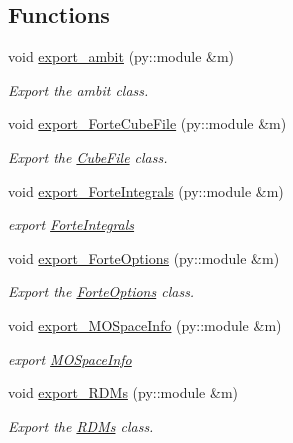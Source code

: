 \subsection*{Functions}
\begin{DoxyCompactItemize}
\item 
void \mbox{\hyperlink{namespaceforte_a7332c10d053d305ad03f4c29c0560031}{export\+\_\+ambit}} (py\+::module \&m)
\begin{DoxyCompactList}\small\item\em Export the ambit class. \end{DoxyCompactList}\item 
void \mbox{\hyperlink{namespaceforte_a646338877ef11d2794e546940f7118c2}{export\+\_\+\+Forte\+Cube\+File}} (py\+::module \&m)
\begin{DoxyCompactList}\small\item\em Export the \mbox{\hyperlink{classforte_1_1_cube_file}{Cube\+File}} class. \end{DoxyCompactList}\item 
void \mbox{\hyperlink{namespaceforte_aefcd99a0cde40f5fa1792e297ed6cd74}{export\+\_\+\+Forte\+Integrals}} (py\+::module \&m)
\begin{DoxyCompactList}\small\item\em export \mbox{\hyperlink{classforte_1_1_forte_integrals}{Forte\+Integrals}} \end{DoxyCompactList}\item 
void \mbox{\hyperlink{namespaceforte_af56187354afd4d129b9b1adc651fd11d}{export\+\_\+\+Forte\+Options}} (py\+::module \&m)
\begin{DoxyCompactList}\small\item\em Export the \mbox{\hyperlink{classforte_1_1_forte_options}{Forte\+Options}} class. \end{DoxyCompactList}\item 
void \mbox{\hyperlink{namespaceforte_a005a509f4aa34de903798c1b9cb7e49a}{export\+\_\+\+M\+O\+Space\+Info}} (py\+::module \&m)
\begin{DoxyCompactList}\small\item\em export \mbox{\hyperlink{classforte_1_1_m_o_space_info}{M\+O\+Space\+Info}} \end{DoxyCompactList}\item 
void \mbox{\hyperlink{namespaceforte_a37b278059430940f68bbe39180483593}{export\+\_\+\+R\+D\+Ms}} (py\+::module \&m)
\begin{DoxyCompactList}\small\item\em Export the \mbox{\hyperlink{classforte_1_1_r_d_ms}{R\+D\+Ms}} class. \end{DoxyCompactList}\item 

\end{DoxyCompactItemize}
